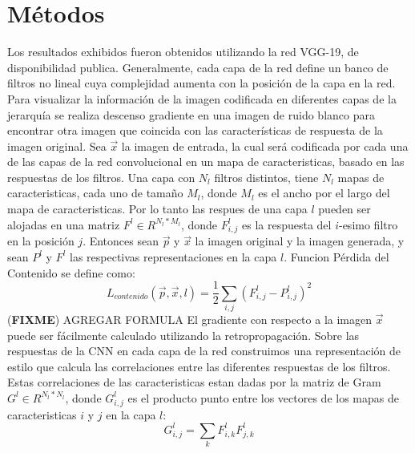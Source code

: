 \documentclass[a4paper,11pt,spanish]{book}
\newcommand*{\FIXME}[1]{{(\textbf{FIXME}) {#1}}}
\begin{document}
    \section{Métodos}
      Los resultados exhibidos fueron obtenidos utilizando la red VGG-19, de disponibilidad publica.
      Generalmente, cada capa de la red define un banco de filtros no lineal cuya complejidad aumenta con la posición de la capa en la red.
      Para visualizar la información de la imagen codificada en diferentes capas de la jerarquía se realiza descenso gradiente en una imagen de ruido blanco
      para encontrar otra imagen que coincida con las características de respuesta de la imagen original.
      Sea $\overrightarrow{x}$ la imagen de entrada, la cual será codificada por cada una de las capas de la red convolucional en un mapa de caracteristicas, basado en las respuestas de los filtros.
      Una capa con $N_l$ filtros distintos, tiene $N_l$ mapas de caracteristicas, cada uno de tamaño $M_l$, donde $M_l$ es el ancho por el largo del mapa de caracteristicas.
      Por lo tanto las respues de una capa $l$ pueden ser alojadas en una matriz $F^l \in R^{N_l * M_l}$, donde $F_{i,j}^l$ es la respuesta del $i$-esimo filtro en la posición $j$.
      Entonces sean $\overrightarrow{p}$ y $\overrightarrow{x}$ la imagen original y la imagen generada, y sean $P^l$ y $F^l$ las respectivas representaciones en la capa $l$.
      Funcion Pérdida del Contenido se define como:
      \begin{equation}
       L_{contenido}(\overrightarrow{p},\overrightarrow{x}, l) = \frac{1}{2} \sum_{i,j} (F_{i,j}^l - P_{i,j}^l)^2
      \end{equation}
      \FIXME{AGREGAR FORMULA}
      El gradiente con respecto a la imagen $\overrightarrow{x}$ puede ser fácilmente calculado utilizando la retropropagación.
      Sobre las respuestas de la CNN en cada capa de la red construimos una representación de estilo que calcula las correlaciones entre las diferentes respuestas de los filtros.
      Estas correlaciones de las caracteristicas estan dadas por la matriz de Gram $G^l \in R^{N_l * N_l}$, donde $G_{i,j}^l$ es el producto punto entre los vectores de los mapas de
      caracteristicas $i$ y $j$ en la capa $l$:
      \begin{equation}
	G_{i,j}^l = \sum_{k} F_{i,k}^l F_{j,k}^l
      \end{equation}
\end{document}
